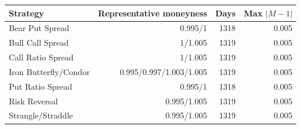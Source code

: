 \begin{tabular}{lrrr}
\toprule
Strategy & Representative moneyness & Days & Max $|M-1|$ \\
\midrule
Bear Put Spread & 0.995/1 & 1318 & 0.005 \\
Bull Call Spread & 1/1.005 & 1319 & 0.005 \\
Call Ratio Spread & 1/1.005 & 1319 & 0.005 \\
Iron Butterfly/Condor & 0.995/0.997/1.003/1.005 & 1319 & 0.005 \\
Put Ratio Spread & 0.995/1 & 1318 & 0.005 \\
Risk Reversal & 0.995/1.005 & 1319 & 0.005 \\
Strangle/Straddle & 0.995/1.005 & 1319 & 0.005 \\
\bottomrule
\end{tabular}
